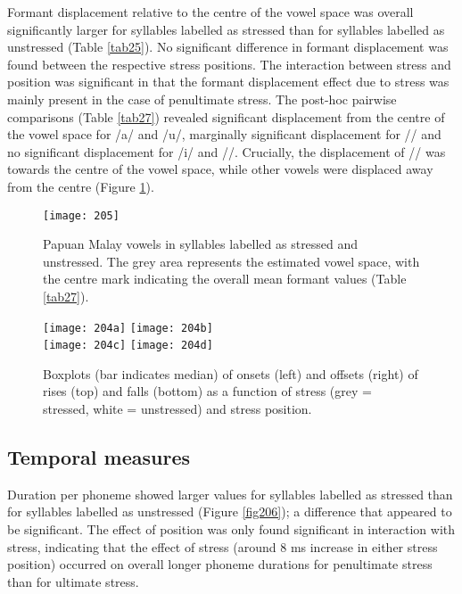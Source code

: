 Formant displacement relative to the centre of the vowel space was overall significantly larger for syllables labelled as stressed than for syllables labelled as unstressed (Table \ref{tab25}). No significant difference in formant displacement was found between the respective stress positions. The interaction between stress and position was significant in that the formant displacement effect due to stress was mainly present in the case of penultimate stress. The post-hoc pairwise comparisons (Table \ref{tab27}) revealed significant displacement from the centre of the vowel space for /a/ and /u/, marginally significant displacement for // and no significant displacement for /i/ and //. Crucially, the displacement of // was towards the centre of the vowel space, while other vowels were displaced away from the centre (Figure \ref{fig205}).



\begin{figure}
\texttt{[image: 205]}
\caption{Papuan Malay vowels in syllables labelled as stressed and unstressed. The grey area represents the estimated vowel space, with the centre mark indicating the overall mean formant values (Table \ref{tab27}).}
\label{fig205}
\end{figure}


\begin{sidewaysfigure}
\texttt{[image: 204a]} \hspace{0.3cm}
\texttt{[image: 204b]} \\ \vspace{0.1cm}
\texttt{[image: 204c]} \hspace{0.3cm}
\texttt{[image: 204d]}
\caption{Boxplots (bar indicates median) of onsets (left) and offsets (right) of rises (top) and falls (bottom) as a function of stress (grey = stressed, white = unstressed) and stress position.}
\label{fig204}
\end{sidewaysfigure}




\subsection{Temporal measures}
Duration per phoneme showed larger values for syllables labelled as stressed than for syllables labelled as unstressed (Figure \ref{fig206}); a difference that appeared to be significant. The effect of position was only found significant in interaction with stress, indicating that the effect of stress (around 8 ms increase in either stress position) occurred on overall longer phoneme durations for penultimate stress than for ultimate stress.\par

